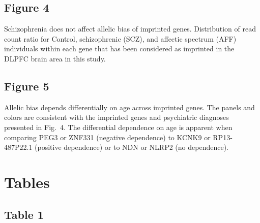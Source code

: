 \documentclass[letterpaper]{article}
\begin{document}
\subsection*{Figure 4}

Schizophrenia does not affect allelic bias of imprinted genes.
Distribution of read count ratio for Control, schizophrenic (SCZ), and
affectic spectrum (AFF) individuals within each gene that has been considered as imprinted in the DLPFC
brain area in this study.

\subsection*{Figure 5}

Allelic bias depends differentially on age across imprinted genes.
The panels and colors are consistent with the imprinted genes and psychiatric diagnoses
presented in Fig.~4.  The differential dependence on age is apparent
when comparing PEG3 or ZNF331 (negative dependence) to KCNK9 or RP13-487P22.1
(positive dependence) or to NDN or NLRP2 (no dependence).

\section*{Tables}

\subsection*{Table 1}
\end{document}
